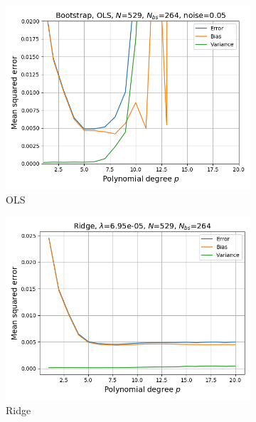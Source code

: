 \documentclass[a4paper]{article}
\begin{document}
\begin{figure}[H]
  \centering
  \begin{subfigure}{0.49\textwidth}
    \includegraphics[scale=0.45]{../figures/task_b/bias_variance_N529_pmax20_nlamb1_noise0.05_seed4155_OLS_boot_Nbs264.png}
    \caption{OLS}
  \end{subfigure}
  \begin{subfigure}{0.49\textwidth}
    \includegraphics[scale=0.45]{../figures/task_d/bias_variance_N529_pmax20_nlamb20_noise0.05_seed4155_Ridge_boot_Nbs264_opt1.png}
    \caption{Ridge}
  \end{subfigure}\\
  \begin{subfigure}{0.49\textwidth}

\end{subfigure}
\end{figure}
\end{document}
